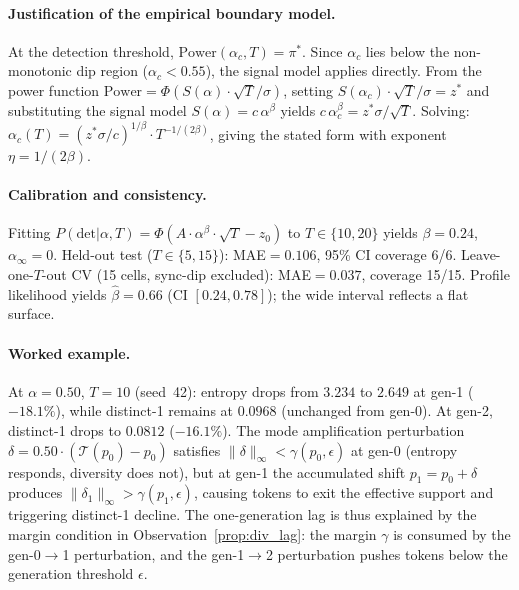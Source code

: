 \paragraph{Justification of the empirical boundary model.}
At the detection threshold, $\mathrm{Power}(\alpha_c, T) = \pi^*$.
Since $\alpha_c$ lies below the non-monotonic dip region ($\alpha_c < 0.55$), the signal model applies directly.
From the power function $\mathrm{Power} = \Phi(S(\alpha) \cdot \sqrt{T} / \sigma)$, setting $S(\alpha_c) \cdot \sqrt{T} / \sigma = z^*$ and substituting the signal model $S(\alpha) = c\,\alpha^\beta$ yields $c\,\alpha_c^\beta = z^* \sigma / \sqrt{T}$.
Solving: $\alpha_c(T) = (z^* \sigma / c)^{1/\beta} \cdot T^{-1/(2\beta)}$, giving the stated form with exponent $\eta = 1/(2\beta)$.

\paragraph{Calibration and consistency.}
Fitting $P(\mathrm{det}|\alpha,T) = \Phi(A \cdot \alpha^\beta \cdot \sqrt{T} - z_0)$ to $T \in \{10, 20\}$ yields $\beta{=}0.24$, $\alpha_\infty{=}0$.
Held-out test ($T \in \{5, 15\}$): MAE${=}0.106$, 95\% CI coverage 6/6.
Leave-one-$T$-out CV (15 cells, sync-dip excluded): MAE${=}0.037$, coverage 15/15.
Profile likelihood yields $\hat{\beta}{=}0.66$ (CI $[0.24, 0.78]$); the wide interval reflects a flat surface.

\paragraph{Worked example.}
At $\alpha{=}0.50$, $T{=}10$ (seed~42): entropy drops from $3.234$ to $2.649$ at gen-1 ($-18.1\%$), while distinct-1 remains at $0.0968$ (unchanged from gen-0).
At gen-2, distinct-1 drops to $0.0812$ ($-16.1\%$).
The mode amplification perturbation $\delta = 0.50 \cdot (\mathcal{T}(p_0) - p_0)$ satisfies $\|\delta\|_\infty < \gamma(p_0, \epsilon)$ at gen-0 (entropy responds, diversity does not), but at gen-1 the accumulated shift $p_1 = p_0 + \delta$ produces $\|\delta_1\|_\infty > \gamma(p_1, \epsilon)$, causing tokens to exit the effective support and triggering distinct-1 decline.
The one-generation lag is thus explained by the margin condition in Observation~\ref{prop:div_lag}: the margin $\gamma$ is consumed by the gen-0$\to$1 perturbation, and the gen-1$\to$2 perturbation pushes tokens below the generation threshold $\epsilon$.

